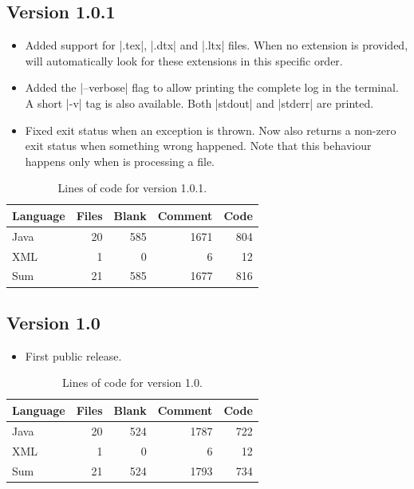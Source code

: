 \documentclass[a4paper,twoside,12pt]{memoir}
\begin{document}
\subsection*{Version 1.0.1}

\begin{itemize}
\item[\newfeature] 
     Added support for |.tex|, |.dtx| and |.ltx| files. When no extension is 
     provided, \arara will automatically look for these extensions in this 
     specific order.
\item[\newfeature] 
     Added the |--verbose| flag to allow printing the complete log in the 
     terminal. A short |-v| tag is also available. Both |stdout| and |stderr| 
     are printed.
\item[\bugfix] 
     Fixed exit status when an exception is thrown. Now \arara also returns a 
     non-zero exit status when something wrong happened. Note that this 
     behaviour happens only when \arara is processing a file.
\end{itemize}

{\renewcommand{\arraystretch}{1.5}
\begin{table}[ht]
\centering
\caption{Lines of code for version 1.0.1.}
\begin{tabular}{lrrrr}
\hline
\textbf{Language} & \textbf{Files} & \textbf{Blank} & \textbf{Comment} & \textbf{Code}\\
\hline
\hline
Java & 20 & 585 & 1671 & 804\\
XML & 1 & 0 & 6 & 12\\
\hline
Sum & 21 & 585 & 1677 & 816\\
\hline
\end{tabular}
\label{tab:locarara101}
\end{table}}

\subsection*{Version 1.0}

\begin{itemize}
\item[\newfeature] First public release.
\end{itemize}

{\renewcommand{\arraystretch}{1.5}
\begin{table}[ht]
\centering
\caption{Lines of code for version 1.0.}
\begin{tabular}{lrrrr}
\hline
\textbf{Language} & \textbf{Files} & \textbf{Blank} & \textbf{Comment} & \textbf{Code}\\
\hline
\hline
Java & 20 & 524 & 1787 & 722\\
XML & 1 & 0 & 6 & 12\\
\hline
Sum & 21 & 524 & 1793 & 734\\
\hline
\end{tabular}
\label{tab:locarara10}
\end{table}}
\end{document}
